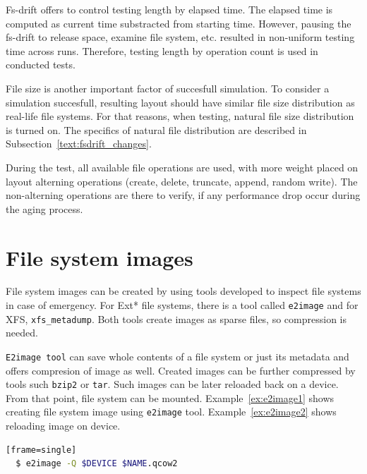 \documentclass[
  color, %
  table, %
  lof,   %
  lot,   %
]{fithesis3}
\begin{document}
Fs-drift offers to control testing length by elapsed time. The elapsed time is computed as current time substracted from starting time. However, pausing the fs-drift to release space, examine file system, etc. resulted in non-uniform testing time across runs. Therefore, testing length by operation count is used in conducted tests.

File size is another important factor of succesfull simulation. To consider a simulation succesfull, resulting layout should have similar file size distribution as real-life file systems. For that reasons, when testing, natural file size distribution is turned on. The specifics of natural file distribution are described in Subsection~\ref{text:fsdrift_changes}.

During the test, all available file operations are used, with more weight placed on layout alterning operations (create, delete, truncate, append, random write). The non-alterning operations are there to verify, if any performance drop occur during the aging process.

\section{File system images}
File system images can be created by using tools developed to inspect file systems in case of emergency. For Ext* file systems, there is a tool called \texttt{e2image} and for XFS, \texttt{xfs\_metadump}. Both tools create images as sparse files, so compression is needed.

\texttt{E2image tool} can save whole contents of a file system or just its metadata and offers compresion of image as well. Created images can be further compressed by tools such \texttt{bzip2} or \texttt{tar}. Such images can be later reloaded back on a device. From that point, file system can be mounted. Example~\ref{ex:e2image1} shows creating file system image using \texttt{e2image} tool. Example~\ref{ex:e2image2} shows reloading image on device.


\begin{lstlisting}[language=bash, label={ex:e2image1}, caption={Creating compressed image using \texttt{e2image}}][frame=single]
  $ e2image -Q $DEVICE $NAME.qcow2
\end{lstlisting}
\end{document}
